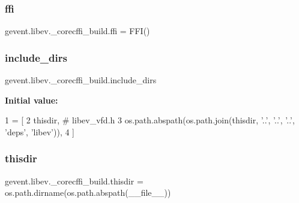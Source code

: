 \subsubsection{\texorpdfstring{ffi}{ffi}}
{\footnotesize\ttfamily gevent.\+libev.\+\_\+corecffi\+\_\+build.\+ffi = F\+FI()}

\mbox{\label{namespacegevent_1_1libev_1_1__corecffi__build_a936bfbc8b93b158dc083a1726cf5fd9d}} 
\subsubsection{\texorpdfstring{include\+\_\+dirs}{include\_dirs}}
{\footnotesize\ttfamily gevent.\+libev.\+\_\+corecffi\+\_\+build.\+include\+\_\+dirs}

{\bfseries Initial value\+:}
\begin{DoxyCode}
1 =  [
2     thisdir, \textcolor{comment}{# libev\_vfd.h}
3     os.path.abspath(os.path.join(thisdir, \textcolor{stringliteral}{'..'}, \textcolor{stringliteral}{'..'}, \textcolor{stringliteral}{'..'}, \textcolor{stringliteral}{'deps'}, \textcolor{stringliteral}{'libev'})),
4 ]
\end{DoxyCode}
\mbox{\label{namespacegevent_1_1libev_1_1__corecffi__build_a0227fdb82b0e400febc41f9171536258}} 
\subsubsection{\texorpdfstring{thisdir}{thisdir}}
{\footnotesize\ttfamily gevent.\+libev.\+\_\+corecffi\+\_\+build.\+thisdir = os.\+path.\+dirname(os.\+path.\+abspath(\+\_\+\+\_\+file\+\_\+\+\_\+))}


